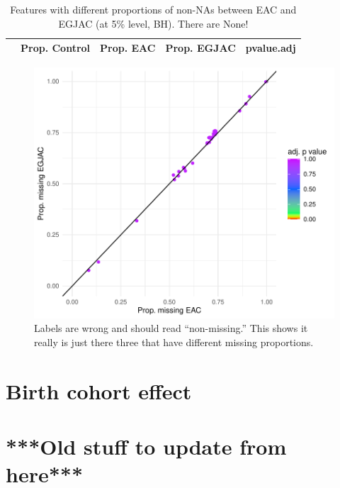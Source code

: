 \documentclass[12pt]{article}
\begin{document}
\begin{table}[ht]
\centering
\begin{tabular}{lrrrr}
\hline
& Prop. Control & Prop. EAC & Prop. EGJAC & pvalue.adj \\
\hline

\hline
\end{tabular}
\caption{Features with different proportions of non-NAs between EAC and EGJAC (at 5\% level, BH).
There are None!}
\end{table}


\begin{figure}[h]
\centering
\includegraphics[width=1.0\textwidth]{figures/eac_v_egjac/vs_propNA.pdf}
\caption{Labels are wrong and should read ``non-missing.'' This shows it really is just there three 
that have different missing proportions.}
\end{figure}



\clearpage
\section*{Birth cohort effect}







\clearpage


\section*{***Old stuff to update from here***}
\end{document}
